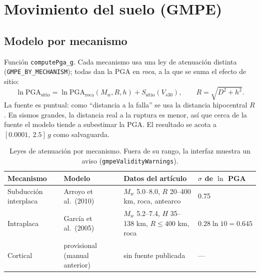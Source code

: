 \documentclass[11pt,a4paper]{article}
\begin{document}
\section{Movimiento del suelo (GMPE)}
\label{sec:gmpe}

\subsection{Modelo por mecanismo}
Función \texttt{computePga\_g}. Cada mecanismo usa una ley de atenuación distinta
(\texttt{GMPE\_BY\_MECHANISM}); todas dan la PGA en \emph{roca}, a la que se suma el efecto de sitio:
\begin{equation}
  \ln \mathrm{PGA}_{\mathrm{sitio}} = \ln \mathrm{PGA}_{\mathrm{roca}}(M_w, R, h) + S_{\mathrm{sitio}}(V_{s30}),
  \qquad R = \sqrt{D^2 + h^2}.
  \label{eq:gmpe}
\end{equation}
La fuente es puntual: como ``distancia a la falla'' se usa la distancia hipocentral $R$. En sismos
grandes, la distancia real a la ruptura es menor, así que cerca de la fuente el modelo tiende a
subestimar la PGA. El resultado se acota a $[0.0001,\ 2.5]\,g$ como salvaguarda.

\begin{table}[h]
\centering
\small
\begin{tabular}{llll}
\toprule
Mecanismo & Modelo & Datos del artículo & $\sigma$ de $\ln$ PGA \\
\midrule
Subducción interplaca & Arroyo et al.\ (2010) & $M_w$ 5.0--8.0, $R$ 20--400 km, roca, antearco & 0.75 \\
Intraplaca & García et al.\ (2005) & $M_w$ 5.2--7.4, $H$ 35--138 km, $R \le 400$ km, roca & $0.28\ln 10 = 0.645$ \\
Cortical & provisional (manual anterior) & sin fuente publicada & --- \\
\bottomrule
\end{tabular}
\caption{Leyes de atenuación por mecanismo. Fuera de su rango, la interfaz muestra un aviso
(\texttt{gmpeValidityWarnings}).}
\end{table}
\end{document}
